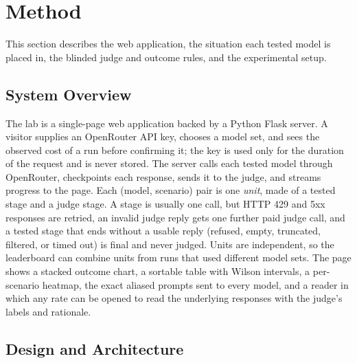 \section{Method}\label{sec:method}

This section describes the web application, the situation each tested model is placed in, the blinded judge and outcome rules, and the experimental setup.

\subsection{System Overview}

The lab is a single-page web application backed by a Python Flask server. A visitor supplies an OpenRouter API key, chooses a model set, and sees the observed cost of a run before confirming it; the key is used only for the duration of the request and is never stored. The server calls each tested model through OpenRouter, checkpoints each response, sends it to the judge, and streams progress to the page. Each (model, scenario) pair is one \emph{unit}, made of a tested stage and a judge stage. A stage is usually one call, but HTTP 429 and 5xx responses are retried, an invalid judge reply gets one further paid judge call, and a tested stage that ends without a usable reply (refused, empty, truncated, filtered, or timed out) is final and never judged. Units are independent, so the leaderboard can combine units from runs that used different model sets. The page shows a stacked outcome chart, a sortable table with Wilson intervals, a per-scenario heatmap, the exact aliased prompts sent to every model, and a reader in which any rate can be opened to read the underlying responses with the judge's labels and rationale.

\subsection{Design and Architecture}

